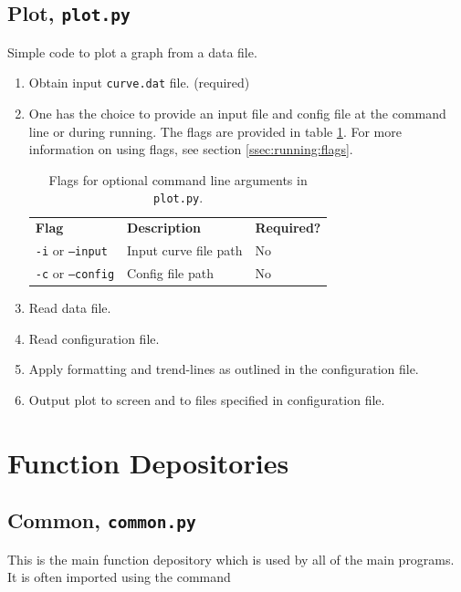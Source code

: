 \subsection{Plot, \texttt{plot.py}}
Simple code to plot a graph from a data file.

\begin{enumerate}
	\item	Obtain input \texttt{curve.dat} file. (required)
	\item[]	%
		{One has the choice to provide an input file and config file at the command line or during running. The flags are provided in table \ref{tab:misc:plot:flags}. For more information on using flags, see section \ref{ssec:running:flags}.
		
		\begin{table}[H]
			\begin{center}
				\begin{tabular}{l l l}
					\hline
					\textbf{Flag}	&	\textbf{Description}	&	\textbf{Required?}\\
					\texttt{-i} or \texttt{--input}		& Input curve file path	&	No	\\
					\texttt{-c} or \texttt{--config}	& Config file path		&	No	\\
					\hline
				\end{tabular}
			\end{center}
			\caption[Plot flags.]{\label{tab:misc:plot:flags}%
				Flags for optional command line arguments in \texttt{plot.py}.%
			}
		\end{table}
		}
	\item	Read data file.
	\item	Read configuration file.
	\item	Apply formatting and trend-lines as outlined in the configuration file.
	\item	Output plot to screen and to files specified in configuration file.
\end{enumerate}


\pagebreak
\section{Function Depositories}

\subsection{Common, \texttt{common.py}}

This is the main function depository which is used by all of the main programs. It is often imported using the command

